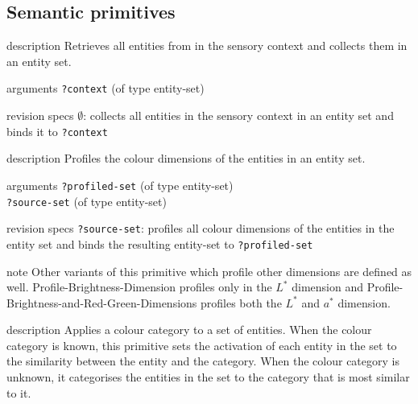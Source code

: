 \subsection{Semantic primitives}


\begin{explanation}{description}
Retrieves all entities from in the sensory context and collects them in an entity set.
\end{explanation}

\begin{explanation}{arguments}
\verb+?context+ (of type entity-set)
\end{explanation}

\begin{explanation}{revision specs}
$\emptyset$: collects all entities in the sensory context in an entity set and binds it to \verb+?context+
\end{explanation}


\begin{explanation}{description}
Profiles the colour dimensions of the entities in an entity set.
\end{explanation}

\begin{explanation}{arguments}
\verb+?profiled-set+ (of type entity-set) \\
\verb+?source-set+ (of type entity-set)
\end{explanation}

\begin{explanation}{revision specs}
  \verb+?source-set+: profiles all colour dimensions of the entities
  in the entity set and binds the resulting entity-set to
  \verb+?profiled-set+
\end{explanation}

\begin{explanation}{note}
  Other variants of this primitive which profile other dimensions are
  defined as well. {\sc Profile-Brightness-Dimension} profiles only in
  the $L^*$ dimension and {\sc
    Profile-Brightness-and-Red-Green-Dimensions} profiles both the
  $L^*$ and $a^*$ dimension.
\end{explanation}


\begin{explanation}{description}
  Applies a colour category to a set of entities. When the colour
  category is known, this primitive sets the activation of each entity
  in the set to the similarity between the entity and the
  category. When the colour category is unknown, it categorises the
  entities in the set to the category that is most similar to it.
\end{explanation}

